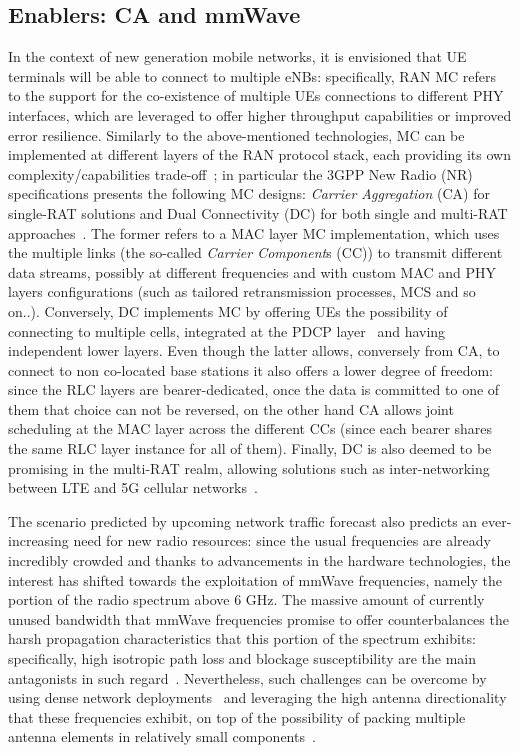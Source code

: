 \documentclass[11pt]{book}
\begin{document}
\subsection{Enablers: CA and mmWave}
In the context of new generation mobile networks, it is envisioned that UE terminals will be able to connect to multiple eNBs: specifically, RAN MC refers to the support for the co-existence of multiple UEs connections to different PHY interfaces, which are leveraged to offer higher throughput capabilities or improved error resilience. Similarly to the above-mentioned technologies, MC can be implemented at different layers of the RAN protocol stack, each providing its own complexity/capabilities trade-off~\cite{rost2017network}; in particular the 3GPP New Radio (NR) specifications presents the following MC designs: \textit{Carrier Aggregation} (CA) for single-RAT solutions and Dual Connectivity (DC) for both single and multi-RAT approaches~\cite{3gppSpec, Zugno_2018}. The former refers to a MAC layer MC implementation, which uses the multiple links (the so-called \textit{Carrier Component}s (CC))  to transmit different data streams, possibly at different frequencies and with custom MAC and PHY layers configurations (such as tailored retransmission processes, MCS and so on..). 
Conversely, DC implements MC by offering UEs the possibility of connecting to multiple cells, integrated at the PDCP layer~\cite{3gppSpec2} and having independent lower layers. Even though the latter allows, conversely from CA, to connect to non co-located base stations it also offers a lower degree of freedom: since the RLC layers are bearer-dedicated, once the data is committed to one of them that choice can not be reversed, on the other hand CA allows joint scheduling at the MAC layer across the different CCs (since each bearer shares the same RLC layer instance for all of them). Finally, DC is also deemed to be promising in the multi-RAT realm, allowing solutions such as inter-networking between LTE and 5G cellular networks~\cite{Silva2015TightIO, Polese_2017}.


The scenario predicted by upcoming network traffic forecast also predicts an ever-increasing need for new radio resources: since the usual frequencies are already incredibly crowded and thanks to advancements in the hardware technologies, the interest has shifted towards the exploitation of mmWave frequencies, namely the portion of the radio spectrum above 6 GHz.  The massive amount of currently unused bandwidth that mmWave frequencies promise to offer counterbalances the harsh propagation characteristics that this portion of the spectrum exhibits: specifically,  high isotropic path loss and blockage susceptibility are the main antagonists in such regard~\cite{rangan2014millimeter}. Nevertheless, such challenges can be overcome by using dense network deployments~\cite{rangan2014millimeter} and leveraging the high antenna directionality that these frequencies exhibit, on top of the possibility of packing multiple antenna elements in relatively small components~\cite{sun2014mimo, roh2014millimeter}.
\end{document}
